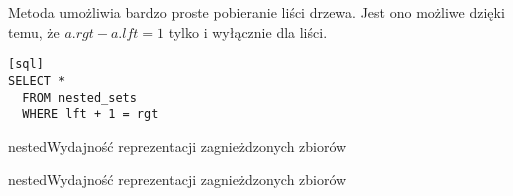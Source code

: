 Metoda umożliwia bardzo proste pobieranie liści drzewa.
Jest ono możliwe dzięki temu, że $a.rgt - a.lft = 1$ tylko i wyłącznie dla liści. 
\begin{verbatim}[sql]
SELECT *
  FROM nested_sets
  WHERE lft + 1 = rgt
\end{verbatim}



\begin{qxtab}{nested}{Wydajność reprezentacji zagnieżdzonych zbiorów}
\end{qxtab}

\begin{qxfig}{nested}{Wydajność reprezentacji zagnieżdzonych zbiorów}
\end{qxfig}

